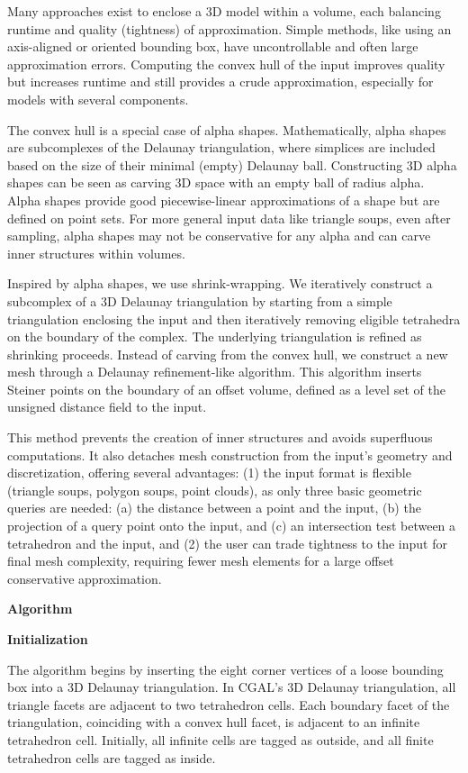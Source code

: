 \documentclass[12pt]{article}
\begin{document}
Many approaches exist to enclose a 3D model within a volume, each balancing runtime
and quality (tightness) of approximation. Simple methods, like using an axis-aligned
or oriented bounding box, have uncontrollable and often large approximation errors.
Computing the convex hull of the input improves quality but increases runtime and
still provides a crude approximation, especially for models with several components.

The convex hull is a special case of alpha shapes. Mathematically, alpha shapes are
subcomplexes of the Delaunay triangulation, where simplices are included based on the
size of their minimal (empty) Delaunay ball. Constructing 3D alpha shapes can be seen
as carving 3D space with an empty ball of radius alpha. Alpha shapes provide good
piecewise-linear approximations of a shape but are defined on point sets. For more
general input data like triangle soups, even after sampling, alpha shapes may not be
conservative for any alpha and can carve inner structures within volumes.

Inspired by alpha shapes, we use shrink-wrapping. We iteratively construct a subcomplex
of a 3D Delaunay triangulation by starting from a simple triangulation enclosing the
input and then iteratively removing eligible tetrahedra on the boundary of the complex.
The underlying triangulation is refined as shrinking proceeds. Instead of carving from
the convex hull, we construct a new mesh through a Delaunay refinement-like algorithm.
This algorithm inserts Steiner points on the boundary of an offset volume, defined as
a level set of the unsigned distance field to the input.

This method prevents the creation of inner structures and avoids superfluous
computations. It also detaches mesh construction from the input's geometry and
discretization, offering several advantages: (1) the input format is flexible (triangle
soups, polygon soups, point clouds), as only three basic geometric queries are needed:
(a) the distance between a point and the input, (b) the projection of a query point
onto the input, and (c) an intersection test between a tetrahedron and the input, and
(2) the user can trade tightness to the input for final mesh complexity, requiring
fewer mesh elements for a large offset conservative approximation.

\textbf{Algorithm}

\textbf{Initialization}

The algorithm begins by inserting the eight corner vertices of a loose bounding box
into a 3D Delaunay triangulation. In CGAL's 3D Delaunay triangulation, all triangle
facets are adjacent to two tetrahedron cells. Each boundary facet of the triangulation,
coinciding with a convex hull facet, is adjacent to an infinite tetrahedron cell.
Initially, all infinite cells are tagged as outside, and all finite tetrahedron cells
are tagged as inside.
\end{document}
